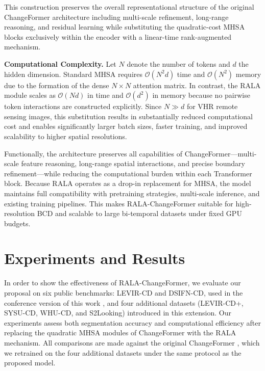 \documentclass[runningheads]{llncs}
\newcommand{\journal}[1]{{\color{orange}#1}}
\begin{document}
This construction preserves the overall representational structure of the
original ChangeFormer architecture including multi-scale refinement, long-range
reasoning, and residual learning while substituting the quadratic-cost MHSA
blocks exclusively within the encoder with a linear-time
rank-augmented mechanism.

\noindent\textbf{Computational Complexity.}
Let $N$ denote the number of tokens and $d$ the hidden dimension.
Standard MHSA requires $\mathcal{O}(N^{2}d)$ time and
$\mathcal{O}(N^{2})$ memory due to the formation of the dense
$N\times N$ attention matrix.
In contrast, the RALA module scales as $\mathcal{O}(Nd)$ in time and
$\mathcal{O}(d^{2})$ in memory because no pairwise token interactions
are constructed explicitly.
Since $N \gg d$ for VHR remote sensing images, this substitution results in
substantially reduced computational cost and enables significantly larger batch
sizes, faster training, and improved scalability to higher spatial resolutions.

Functionally, the architecture preserves all capabilities of
ChangeFormer—multi-scale feature reasoning, long-range spatial interactions,
and precise boundary refinement—while reducing the computational burden within
each Transformer block. Because RALA operates as a drop-in replacement for
MHSA, the model maintains full compatibility with pretraining strategies,
multi-scale inference, and existing training pipelines. This makes
RALA-ChangeFormer suitable for high-resolution BCD and scalable to large
bi-temporal datasets under fixed GPU budgets.

\section{Experiments and Results}
\label{sec:experiments}

\noindent
In order to show the effectiveness of RALA-ChangeFormer, we evaluate our
proposal on \journal{six public benchmarks: LEVIR-CD and DSIFN-CD, used in the
conference version of this work \cite{acuna2026efficient}, and four additional
datasets (LEVIR-CD+, SYSU-CD, WHU-CD, and S2Looking) introduced in this
extension}. Our experiments assess both
segmentation accuracy and computational efficiency after replacing the quadratic
MHSA modules of ChangeFormer with the RALA mechanism. All comparisons are made
against the original ChangeFormer \cite{Bandara2022ChangeFormer}\journal{,
which we retrained on the four additional datasets under the same protocol as
the proposed model}.
\end{document}
